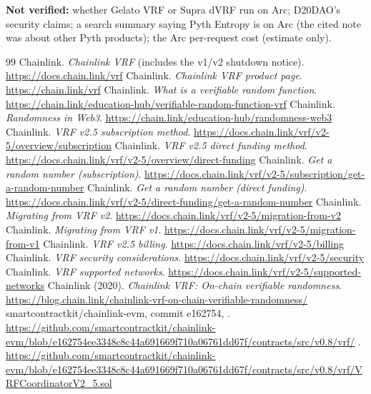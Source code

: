 \documentclass[11pt,a4paper]{article}
\begin{document}
\medskip
\noindent\textbf{Not verified:} whether Gelato VRF or Supra dVRF run on Arc; D20DAO's security claims; a search summary saying Pyth Entropy is on Arc (the cited note was about other Pyth products); the Arc per-request cost (estimate only).

\begin{thebibliography}{99}
\small
{} Chainlink. \emph{Chainlink VRF} (includes the v1/v2 shutdown notice). \url{https://docs.chain.link/vrf}
 Chainlink. \emph{Chainlink VRF product page}. \url{https://chain.link/vrf}
 Chainlink. \emph{What is a verifiable random function}. \url{https://chain.link/education-hub/verifiable-random-function-vrf}
 Chainlink. \emph{Randomness in Web3}. \url{https://chain.link/education-hub/randomness-web3}
 Chainlink. \emph{VRF v2.5 subscription method}. \url{https://docs.chain.link/vrf/v2-5/overview/subscription}
 Chainlink. \emph{VRF v2.5 direct funding method}. \url{https://docs.chain.link/vrf/v2-5/overview/direct-funding}
 Chainlink. \emph{Get a random number (subscription)}. \url{https://docs.chain.link/vrf/v2-5/subscription/get-a-random-number}
 Chainlink. \emph{Get a random number (direct funding)}. \url{https://docs.chain.link/vrf/v2-5/direct-funding/get-a-random-number}
 Chainlink. \emph{Migrating from VRF v2}. \url{https://docs.chain.link/vrf/v2-5/migration-from-v2}
 Chainlink. \emph{Migrating from VRF v1}. \url{https://docs.chain.link/vrf/v2-5/migration-from-v1}
 Chainlink. \emph{VRF v2.5 billing}. \url{https://docs.chain.link/vrf/v2-5/billing}
 Chainlink. \emph{VRF security considerations}. \url{https://docs.chain.link/vrf/v2-5/security}
 Chainlink. \emph{VRF supported networks}. \url{https://docs.chain.link/vrf/v2-5/supported-networks}
 Chainlink (2020). \emph{Chainlink VRF: On-chain verifiable randomness}. \url{https://blog.chain.link/chainlink-vrf-on-chain-verifiable-randomness/}
 smartcontractkit/chainlink-evm, commit e162754, . \url{https://github.com/smartcontractkit/chainlink-evm/blob/e162754ee3348c8c44a691669f710a06761dd67f/contracts/src/v0.8/vrf/}
 . \url{https://github.com/smartcontractkit/chainlink-evm/blob/e162754ee3348c8c44a691669f710a06761dd67f/contracts/src/v0.8/vrf/VRFCoordinatorV2_5.sol}

\end{thebibliography}
\end{document}
